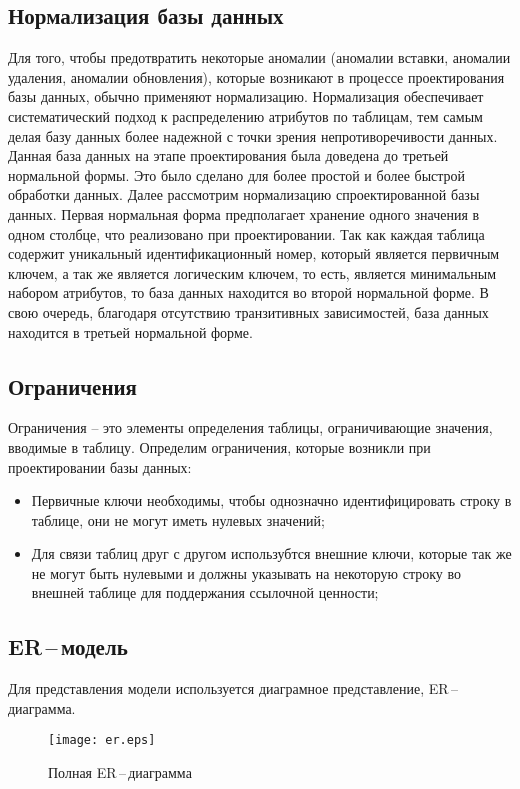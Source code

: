 \subsection{Нормализация базы данных}
Для того, чтобы предотвратить некоторые аномалии (аномалии вставки, аномалии удаления,
аномалии обновления), которые возникают в процессе проектирования базы данных, обычно
применяют нормализацию. Нормализация обеспечивает систематический подход к распределению
атрибутов по таблицам, тем самым делая базу данных более надежной с точки зрения
непротиворечивости данных. Данная база данных на этапе проектирования была доведена до
третьей нормальной формы. Это было сделано для более простой и более быстрой обработки
данных.
\newpar
Далее рассмотрим нормализацию спроектированной базы данных.
\newpar
Первая нормальная форма предполагает хранение одного значения в одном столбце, что
реализовано при проектировании. Так как каждая таблица содержит уникальный
идентификационный номер, который является первичным ключем, а так же является логическим ключем,
то есть, является минимальным набором атрибутов, то база данных находится во второй
нормальной форме. В свою очередь, благодаря отсутствию транзитивных зависимостей, база
данных находится в третьей нормальной форме.

\subsection{Ограничения}
Ограничения -- это элементы определения таблицы, ограничивающие значения, вводимые в
таблицу. Определим ограничения, которые возникли при проектировании базы данных:
\begin{itemize}
    \item Первичные ключи необходимы, чтобы однозначно идентифицировать строку в таблице,
        они не могут иметь нулевых значений;
    \item Для связи таблиц друг с другом использубтся внешние ключи, которые так же не могут быть
        нулевыми и должны указывать на некоторую строку во внешней таблице для поддержания
        ссылочной ценности;
\end{itemize}

\subsection{ER\,--\,модель}
Для представления модели используется диаграмное представление, ER\,--\,диаграмма.
\begin{figure}[tb]
    \centerline{\texttt{[image: er.eps]}}
    \caption{Полная ER\,--\,диаграмма}\label{er}
\end{figure}

